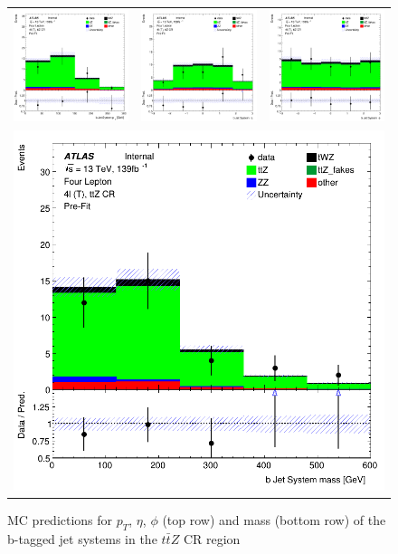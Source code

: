 \begin{figure}[htbp]
\centering
  \begin{tabular}{ccc}

    \includegraphics[width=.2\textwidth]{figures/PreFitPlots/lep4_ttZ_4T_bJet_sys_Pt}&
    \includegraphics[width=.2\textwidth]{figures/PreFitPlots/lep4_ttZ_4T_bJet_sys_Eta} &
    \includegraphics[width=.2\textwidth]{figures/PreFitPlots/lep4_ttZ_4T_bJet_sys_Phi} \\
    \multicolumn{3}{c}{\includegraphics[width=.2\textwidth]{figures/PreFitPlots/lep4_ttZ_4T_bJet_sys_mass}}

  \end{tabular}
  \caption{MC predictions for $p_{T}$, $\eta$, $\phi$ (top row) and mass (bottom row) of the b-tagged jet systems in the $t\bar{t}Z$ CR region }
  \label{fig:4lep-ttZ-CR-bjet-sys-Plots}
\end{figure}

